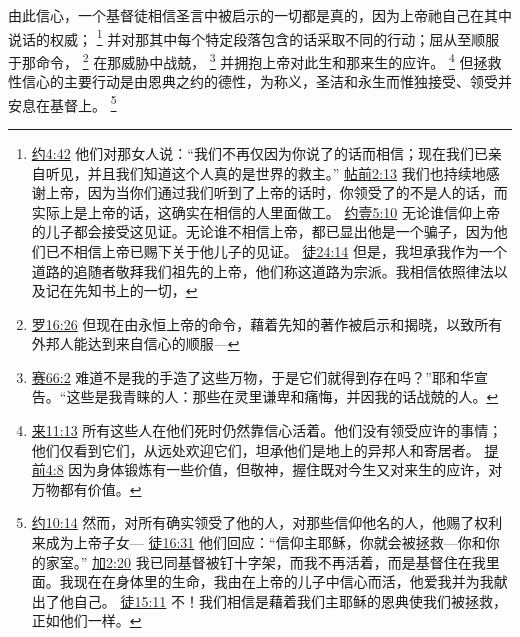 \documentclass[12pt, a4paper, oneside]{ctexart}
\newcounter{parnum}[section]
\newcommand{\N}{%
   \noindent\refstepcounter{parnum}%
    \makebox[\parindent][l]{\textbf{\arabic{parnum}.}}}
\begin{document}
\N 由此信心，一个基督徒相信圣言中被启示的一切都是真的，因为上帝祂自己在其中说话的权威；
	\footnote {
		\href{https://biblehub.com/john/4-42.htm}{约4:42} 他们对那女人说：“我们不再仅因为你说了的话而相信；现在我们已亲自听见，并且我们知道这个人真的是世界的救主。”
		\href{https://biblehub.com/1_thessalonians/2-13.htm}{帖前2:13} 我们也持续地感谢上帝，因为当你们通过我们听到了上帝的话时，你领受了的不是人的话，而实际上是上帝的话，这确实在相信的人里面做工。
		\href{https://biblehub.com/1_john/5-10.htm}{约壹5:10} 无论谁信仰上帝的儿子都会接受这见证。无论谁不相信上帝，都已显出他是一个骗子，因为他们已不相信上帝已赐下关于他儿子的见证。
		\href{https://biblehub.com/acts/24-14.htm}{徒24:14} 但是，我坦承我作为一个道路的追随者敬拜我们祖先的上帝，他们称这道路为宗派。我相信依照律法以及记在先知书上的一切，
	}
	并对那其中每个特定段落包含的话采取不同的行动；屈从至顺服于那命令，
	\footnote {
		\href{https://biblehub.com/romans/16-26.htm}{罗16:26} 但现在由永恒上帝的命令，藉着先知的著作被启示和揭晓，以致所有外邦人能达到来自信心的顺服---
	}
	在那威胁中战兢，
	\footnote {
		\href{https://biblehub.com/isaiah/66-2.htm}{赛66:2} 难道不是我的手造了这些万物，于是它们就得到存在吗？”耶和华宣告。“这些是我青睐的人：那些在灵里谦卑和痛悔，并因我的话战兢的人。
	}
	并拥抱上帝对此生和那来生的应许。
	\footnote {
		\href{https://biblehub.com/hebrews/11-13.htm}{来11:13} 所有这些人在他们死时仍然靠信心活着。他们没有领受应许的事情；他们仅看到它们，从远处欢迎它们，坦承他们是地上的异邦人和寄居者。
		\href{https://biblehub.com/1_timothy/4-8.htm}{提前4:8} 因为身体锻炼有一些价值，但敬神，握住既对今生又对来生的应许，对万物都有价值。
	}
	但拯救性信心的主要行动是由恩典之约的德性，为称义，圣洁和永生而惟独接受、领受并安息在基督上。
	\footnote {
		\href{https://biblehub.com/john/1-12.htm}{约10:14} 然而，对所有确实领受了他的人，对那些信仰他名的人，他赐了权利来成为上帝子女---
		\href{https://biblehub.com/acts/16-31.htm}{徒16:31} 他们回应：“信仰主耶稣，你就会被拯救---你和你的家室。”
		\href{https://biblehub.com/galatians/2-20.htm}{加2:20} 我已同基督被钉十字架，而我不再活着，而是基督住在我里面。我现在在身体里的生命，我由在上帝的儿子中信心而活，他爱我并为我献出了他自己。
		\href{https://biblehub.com/acts/15-11.htm}{徒15:11} 不！我们相信是藉着我们主耶稣的恩典使我们被拯救，正如他们一样。
	}
\end{document}
